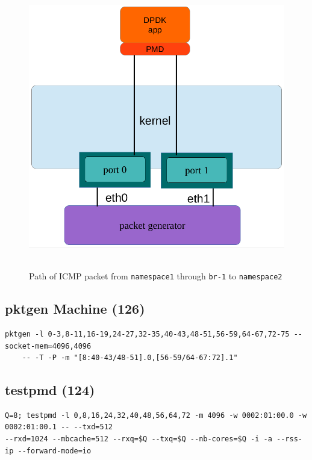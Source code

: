\documentclass[letter]{article}
\begin{document}
{{\begin{figure}[H]
\caption{Path of ICMP packet from \texttt{namespace1} through \texttt{br-1} to \texttt{namespace2}}
\hbox{\hspace{-0.5cm} \includegraphics[scale=0.6]{i-o-2-ports} }
\end{figure}

\subsection{pktgen Machine (126)}

\begin{lstlisting}
pktgen -l 0-3,8-11,16-19,24-27,32-35,40-43,48-51,56-59,64-67,72-75 --socket-mem=4096,4096 
	-- -T -P -m "[8:40-43/48-51].0,[56-59/64-67:72].1"
\end{lstlisting}

\subsection{testpmd (124)}

\begin{lstlisting}[escapechar=!]
Q=8; testpmd -l 0,8,16,24,32,40,48,56,64,72 -m 4096 -w 0002:01:00.0 -w 0002:01:00.1 -- --txd=512
--rxd=1024 --mbcache=512 --rxq=$Q --txq=$Q --nb-cores=$Q -i -a --rss-ip --forward-mode=io
\end{lstlisting}

}}
\end{document}
